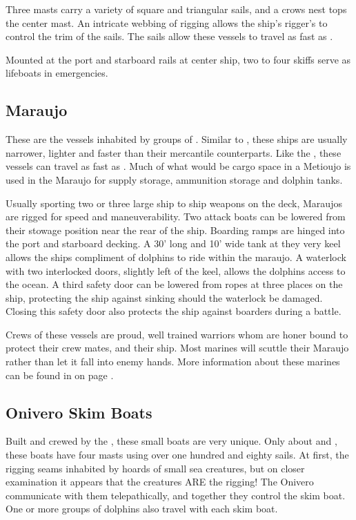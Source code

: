\begin{multicols*}{2}
Three masts carry a variety of square and triangular sails, and a crows nest tops the center mast. An intricate webbing of rigging allows the ship's rigger's to control the trim of the sails. The sails allow these vessels to travel as fast as .

Mounted at the port and starboard rails at center ship, two to four skiffs serve as lifeboats in emergencies.
\subsection{Maraujo}
These are the vessels inhabited by groups of . Similar to , these ships are usually narrower, lighter and faster than their mercantile counterparts. Like the , these vessels can travel as fast as . Much of what would be cargo space in a Metioujo is used in the Maraujo for supply storage, ammunition storage and dolphin tanks.

Usually sporting two or three large ship to ship weapons on the deck, Maraujos are rigged for speed and maneuverability. Two attack boats can be lowered from their stowage position near the rear of the ship. Boarding ramps are hinged into the port and starboard decking.
A 30' long and 10' wide tank at they very keel allows the ships compliment of dolphins to ride within the maraujo. A waterlock with two interlocked doors, slightly left of the keel, allows the dolphins access to the ocean. A third safety door can be lowered from ropes at three places on the ship, protecting the ship against sinking should the waterlock be damaged. Closing this safety door also protects the ship against boarders during a battle.

Crews of these vessels are proud, well trained warriors whom are honer bound to protect their crew mates, and their ship. Most marines will scuttle their Maraujo rather than let it fall into enemy hands. More information about these marines can be found in  on page .
\subsection{Onivero Skim Boats}
Built and crewed by the , these small boats are very unique. Only about  and , these boats have four masts using over one hundred and eighty sails. At first, the rigging seams inhabited by hoards of small sea creatures, but on closer examination it appears that the creatures ARE the rigging! The Onivero communicate with them telepathically, and together they control the skim boat. One or more groups of dolphins also travel with each skim boat.


\end{multicols*}
